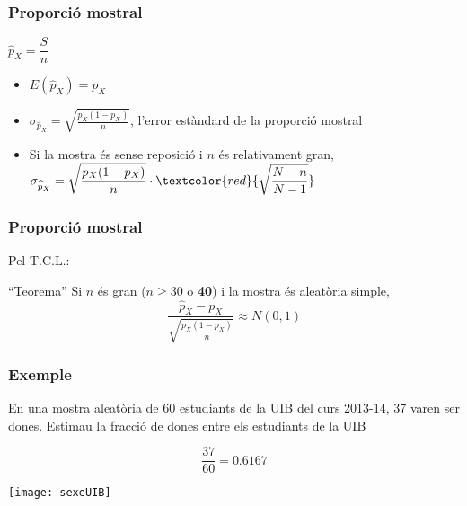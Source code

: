 \documentclass[12pt,t]{beamer}
\newcommand{\red}[1]{\textcolor{red}{#1}}
\renewcommand{\emph}[1]{{\color{red}#1}}
\renewcommand{\geq}{\geqslant}
\theoremstyle{plain}
\theoremstyle{definition}
\begin{document}
\begin{frame}
\frametitle{Proporció mostral}
$\widehat{p}_X=\dfrac{S}{n}$
\medskip

\begin{itemize}
\item $E(\widehat{p}_X)=p_X$
\medskip


\item $\displaystyle \sigma_{\widehat{p}_X}=\sqrt{\frac{p_X(1-p_X)}{n}}$, l'\emph{error estàndard} de la proporció mostral
\medskip

\item Si la mostra és sense reposició i $n$ és relativament gran,
$\displaystyle\sigma_{\widehat{p}_X}=\sqrt{\frac{p_X(1-p_X)}{n}}\cdot\red{\sqrt{\frac{N-n}{N-1}}}$
\end{itemize}

\end{frame}


\begin{frame}
\frametitle{Proporció mostral}
\vspace*{-2ex}

Pel T.C.L.:

\begin{block}{``Teorema''}
Si $n$ és gran (\emph{$n\geq 30$ o \underline{\textbf{40}}}) i la mostra és aleatòria simple, 
$$
\frac{\widehat{p}_X-p_X}{\sqrt{\frac{{p}_X(1-{p}_X)}{n}}}\approx N(0,1)
$$
\end{block}

\end{frame}


\begin{frame}
\frametitle{Exemple}
\vspace*{-2ex}

En una mostra aleatòria de 60 estudiants de la UIB del curs 2013-14, 37 varen ser dones. Estimau la fracció de dones entre els estudiants de la UIB
\pause\medskip

$$
\frac{37}{60}=0.6167
$$
\pause\vspace*{-2ex}

\begin{center}
\texttt{[image: sexeUIB]}
\end{center}


\end{frame}
\end{document}
